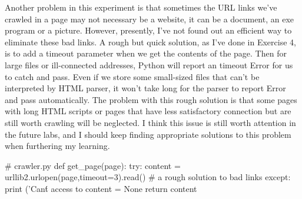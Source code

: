 \documentclass{article}
\begin{document}
Another problem in this experiment is that sometimes the URL links we've crawled in a page may not necessary be a website, it can be a document, an exe program or a picture. However, presently, I've not found out an efficient way to eliminate these bad links.  A rough but quick solution, as I've done in Exercise 4, is to add a timeout parameter when we get the contents of the page. Then for large files or ill-connected addresses, Python will report an timeout Error for us to catch and pass. Even if we store some small-sized files that can't be interpreted by HTML parser, it won't take long for the parser to report Error and pass automatically. The problem with this rough solution is that some pages with long HTML scripts or pages that have less satisfactory connection but are still worth crawling will be neglected. I think this issue is still worth attention in the future labs, and I should keep finding appropriate solutions to this problem when furthering my learning.
\begin{python}
# crawler.py
def get_page(page):
    try:
        content = urllib2.urlopen(page,timeout=3).read()
        # a rough solution to bad links
    except:
        print ('Can\'t access to %
        content = None
    return content
\end{python}
\end{document}
